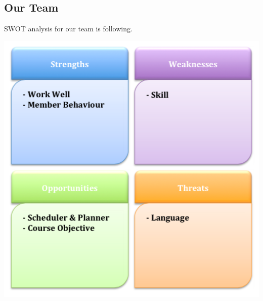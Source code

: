 \documentclass[11pt]{article}
\begin{document}
	\subsection{Our Team}
	\indent\indent SWOT analysis for our team is following.
	\begin{center}			
			\includegraphics[scale = 0.4]{Figure02}
	\end{center}
\end{document}
